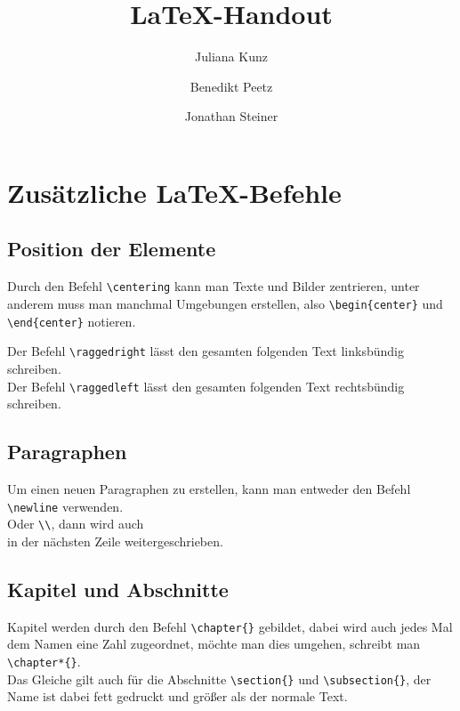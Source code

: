 \documentclass{report}
\title{\LaTeX{}-Handout}
\author{Juliana Kunz \and Benedikt Peetz \and Jonathan Steiner}
\date{}
\begin{document}
\maketitle

\chapter*{\centering Zusätzliche \LaTeX{}-Befehle}
\section*{Position der Elemente}
Durch den Befehl {\color{blue}\verb|\centering|} kann man Texte und Bilder zentrieren, unter anderem muss man manchmal Umgebungen erstellen, also {\color{blue}\verb|\begin{center}|} und {\color{blue}\verb|\end{center}|} notieren.\\
\raggedright Der Befehl {\color{blue}\verb|\raggedright|} lässt den gesamten folgenden Text linksbündig schreiben.\\
\raggedleft Der Befehl {\color{blue}\verb|\raggedleft|} lässt den gesamten folgenden Text rechtsbündig schreiben.

\raggedright

\section*{Paragraphen}
Um einen neuen Paragraphen zu erstellen, kann man entweder den Befehl {\color{blue}\verb|\newline|} \newline verwenden.\\ Oder {\color{blue}\verb|\\|}, dann wird auch \\ in der nächsten Zeile weitergeschrieben.

\section*{Kapitel und Abschnitte}
Kapitel werden durch den Befehl {\color{blue}\verb|\chapter{}|} gebildet, dabei wird auch jedes Mal dem Namen eine Zahl zugeordnet, möchte man dies umgehen, schreibt man {\color{blue}\verb|\chapter*{}|}.\\
Das Gleiche gilt auch für die Abschnitte {\color{blue}\verb|\section{}|} und {\color{blue}\verb|\subsection{}|}, der Name ist dabei fett gedruckt und größer als der normale Text.
\end{document}
